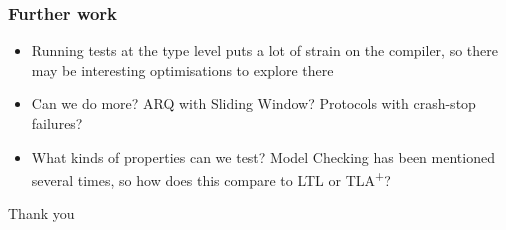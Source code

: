 \documentclass[compress,handout]{beamer}
\begin{document}


\begin{frame}
  \frametitle{Further work}

  \begin{itemize}
    \item<1-> Running tests at the type level puts a lot of strain on the
              compiler, so there may be interesting optimisations to explore
              there
    \item<2-> Can we do more? ARQ with Sliding Window? Protocols with crash-stop
              failures?
    \item<3-> What kinds of properties can we test? Model Checking has been
              mentioned several times, so how does this compare to LTL or
              TLA\textsuperscript{+}?
  \end{itemize}

\end{frame}


\begin{frame}

  \begin{center}
    \textcolor<1>{staDarkGreen}{\Large Thank you}
  \end{center}

\end{frame}
\end{document}
